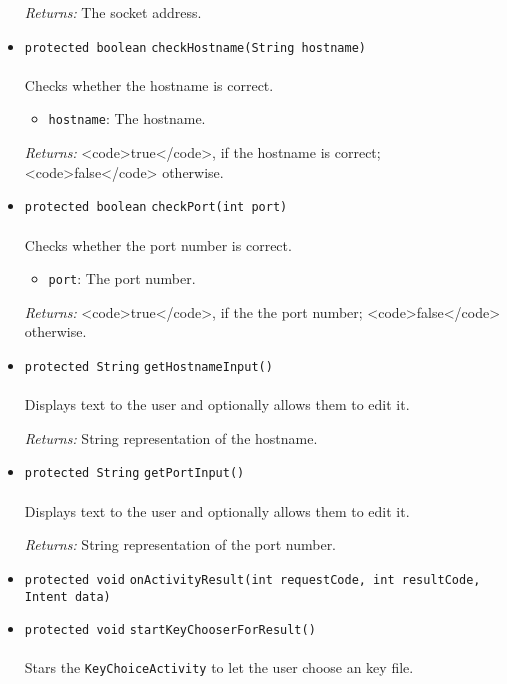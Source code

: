 \begin{itemize}
\emph{Returns:} The socket address.

\item \lstinline|protected boolean| \lstinline|checkHostname|\lstinline|(String hostname)|\\ \\[-0.6em]
Checks whether the hostname is correct.
\begin{itemize}
\item \lstinline|hostname|: The hostname.
\end{itemize}

\emph{Returns:} <code>true</code>, if the hostname is correct; <code>false</code> otherwise.

\item \lstinline|protected boolean| \lstinline|checkPort|\lstinline|(int port)|\\ \\[-0.6em]
Checks whether the port number is correct.
\begin{itemize}
\item \lstinline|port|: The port number.
\end{itemize}

\emph{Returns:} <code>true</code>, if the the port number; <code>false</code> otherwise.

\item \lstinline|protected String| \lstinline|getHostnameInput|\lstinline|()|\\ \\[-0.6em]
Displays text to the user and optionally allows them to edit it.

\emph{Returns:} String representation of the hostname.

\item \lstinline|protected String| \lstinline|getPortInput|\lstinline|()|\\ \\[-0.6em]
Displays text to the user and optionally allows them to edit it.

\emph{Returns:} String representation of the port number.

\item \lstinline|protected void| \lstinline|onActivityResult|\lstinline|(int requestCode, int resultCode, Intent data)| \\[-0.6em]




\item \lstinline|protected void| \lstinline|startKeyChooserForResult|\lstinline|()|\\ \\[-0.6em]
Stars the \lstinline|KeyChoiceActivity| to let the user choose an key file.




\end{itemize}
